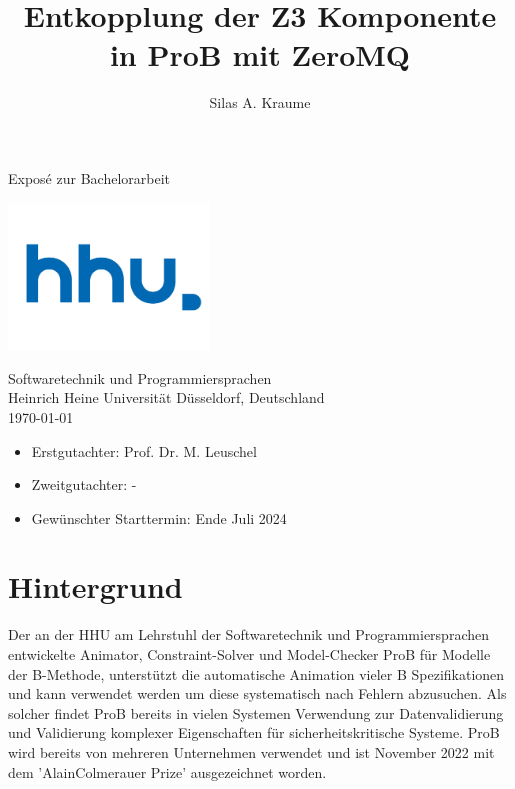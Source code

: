 \documentclass[11pt,a4paper]{scrartcl}
\begin{document}
\author{Silas A. Kraume}
\title{Entkopplung der Z3 Komponente in ProB mit ZeroMQ}
\begin{titlepage}
    \begin{center}
        \vspace*{1cm}
        \Huge
        \makeatletter
        \textbf{\@title}
        \makeatother
        \vspace{1.5cm}

        \LARGE
        \makeatletter
        \textbf{\@author}
        \makeatother
        \vfill

        Exposé zur Bachelorarbeit

        \vfill

        \includegraphics[width=0.4\textwidth]{hhu-logo}

        \Large
        Softwaretechnik und Programmiersprachen\\
        Heinrich Heine Universität Düsseldorf, Deutschland\\
        \today
        \vfill

        \large\begin{itemize}
            \item Erstgutachter: \space\space\space Prof. Dr. M. Leuschel
            \item Zweitgutachter: -
            \item Gewünschter Starttermin: Ende Juli 2024
        \end{itemize}

    \end{center}
\end{titlepage}

\section{Hintergrund}
Der an der HHU am Lehrstuhl der Softwaretechnik und Programmiersprachen entwickelte Animator, Constraint-Solver und Model-Checker ProB \parencite{ProB_2} für Modelle der B-Methode,
unterstützt die automatische Animation vieler B Spezifikationen und kann verwendet werden um diese systematisch nach Fehlern abzusuchen.
Als solcher findet ProB bereits in vielen Systemen Verwendung zur Datenvalidierung und Validierung komplexer Eigenschaften für sicherheitskritische Systeme.
ProB wird bereits von mehreren Unternehmen verwendet und ist November 2022 mit dem 'AlainColmerauer Prize' ausgezeichnet worden.
\end{document}

